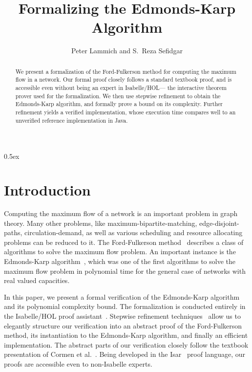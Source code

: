 \documentclass[11pt,a4paper]{article}
\begin{document}
\title{Formalizing the Edmonds-Karp Algorithm}
\author{Peter Lammich and S.~Reza Sefidgar}
\maketitle

\begin{abstract}
We present a formalization of the Ford-Fulkerson method for computing the maximum flow in a network.
Our formal proof closely follows a standard textbook proof, and is accessible even without being
an expert in Isabelle/HOL--- the interactive theorem prover used for the formalization.
We then use stepwise refinement to obtain the Edmonds-Karp algorithm, and formally prove a bound on its complexity.
Further refinement yields a verified implementation, whose execution time compares well to an unverified reference implementation in Java.
\end{abstract}

\clearpage
\tableofcontents

\clearpage

\parindent 0pt\parskip 0.5ex

\section{Introduction}
Computing the maximum flow of a network is an important problem in graph theory.
Many other problems, like maximum-bipartite-matching, edge-disjoint-paths,
circulation-demand, as well as various scheduling and resource allocating
problems can be reduced to it. The Ford-Fulkerson method~\cite{FF56} describes a
class of algorithms to solve the maximum flow problem. An important instance is
the Edmonds-Karp algorithm~\cite{EK72}, which was one of the first algorithms to
solve the maximum flow problem in polynomial time for the general case of
networks with real valued capacities.

In this paper, we present a formal verification of the Edmonds-Karp algorithm
and its polynomial complexity bound. The formalization is conducted entirely in
the Isabelle/HOL proof assistant~\cite{NPW02}. Stepwise refinement
techniques~\cite{Wirth71,Back78,BaWr98} allow us to elegantly structure our
verification into an abstract proof of the Ford-Fulkerson method, its
instantiation to the Edmonds-Karp algorithm, and finally an efficient
implementation. The abstract parts of our verification closely follow the
textbook presentation of Cormen et al.~\cite{CLRS09}. Being developed in the
Isar~\cite{Wenzel99} proof language, our proofs are accessible even to
non-Isabelle experts.
\end{document}
